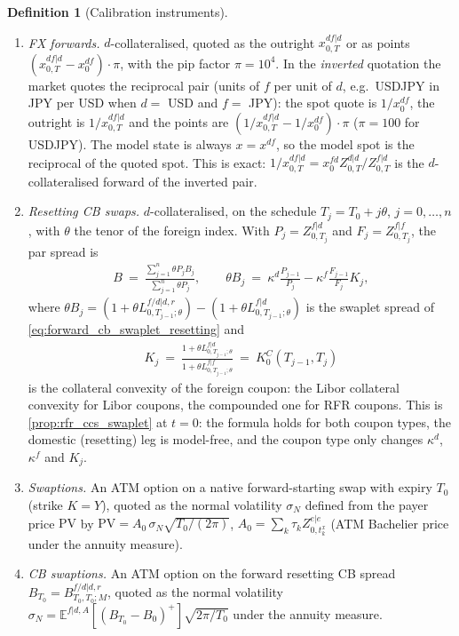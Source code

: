 \documentclass[11pt,english]{amsart}
\newcommand{\EE}{\mathbb{E}}
\theoremstyle{definition}
\newtheorem{defi}{Definition}
\begin{document}
\begin{defi}[Calibration instruments]
\begin{enumerate}
\item \emph{FX forwards.} $d$-collateralised, quoted as the outright $x^{df|d}_{0,T}$ or as points $(x^{df|d}_{0,T} - x^{df}_0)\cdot\pi$, with the pip factor $\pi = 10^4$. In the \emph{inverted} quotation the market quotes the reciprocal pair (units of $f$ per unit of $d$, e.g.\ USDJPY in JPY per USD when $d = $ USD and $f = $ JPY): the spot quote is $1/x^{df}_0$, the outright is $1/x^{df|d}_{0,T}$ and the points are $(1/x^{df|d}_{0,T} - 1/x^{df}_0)\cdot\pi$ ($\pi = 100$ for USDJPY). The model state is always $x = x^{df}$, so the model spot is the reciprocal of the quoted spot. This is exact: $1/x^{df|d}_{0,T} = x^{fd}_0Z^{d|d}_{0,T}/Z^{f|d}_{0,T}$ is the $d$-collateralised forward of the inverted pair.
\item \emph{Resetting CB swaps.} $d$-collateralised, on the schedule $T_j = T_0 + j\theta$, $j = 0,\ldots,n$, with $\theta$ the tenor of the foreign index. With $P_j = Z^{f|d}_{0,T_j}$ and $F_j = Z^{f|f}_{0,T_j}$, the par spread is
\begin{eqnarray}
  B ~=~ \frac{\sum_{j=1}^n \theta P_j B_j}{\sum_{j=1}^n \theta P_j} , \qquad
  \theta B_j ~=~ \kappa^d \frac{P_{j-1}}{P_j} - \kappa^f \frac{F_{j-1}}{F_j} K_j ,
  \label{eq:cal_ccs_spread}
\end{eqnarray}
where $\theta B_j = (1+\theta L^{f/d|d,r}_{0,T_{j-1};\theta}) - (1+\theta L^{f|d}_{0,T_{j-1};\theta})$ is the swaplet spread of \eqref{eq:forward_cb_swaplet_resetting} and
\begin{eqnarray}
  K_j ~=~ \frac{1+\theta L^{f|d}_{0,T_{j-1};\theta}}{1+\theta L^{f|f}_{0,T_{j-1};\theta}} ~=~ K^C_0(T_{j-1},T_j)
\end{eqnarray}
is the collateral convexity of the foreign coupon: the Libor collateral convexity for Libor coupons, the compounded one for RFR coupons. This is \autoref{prop:rfr_ccs_swaplet} at $t = 0$: the formula holds for both coupon types, the domestic (resetting) leg is model-free, and the coupon type only changes $\kappa^d$, $\kappa^f$ and $K_j$.
\item \emph{Swaptions.} An ATM option on a native forward-starting swap with expiry $T_0$ (strike $K = Y$), quoted as the normal volatility $\sigma_N$ defined from the payer price $\mathrm{PV}$ by $\mathrm{PV} = A_0\,\sigma_N\sqrt{T_0/(2\pi)}$, $A_0 = \sum_k\tau_k Z^{e|e}_{0,t^x_k}$ (ATM Bachelier price under the annuity measure).
\item \emph{CB swaptions.} An ATM option on the forward resetting CB spread $B_{T_0} = B^{f/d|d,r}_{T_0,T_0;M}$, quoted as the normal volatility $\sigma_N = \EE^{f|d,A}[(B_{T_0}-B_0)^+]\sqrt{2\pi/T_0}$ under the annuity measure.

\end{enumerate}
\end{defi}
\end{document}
